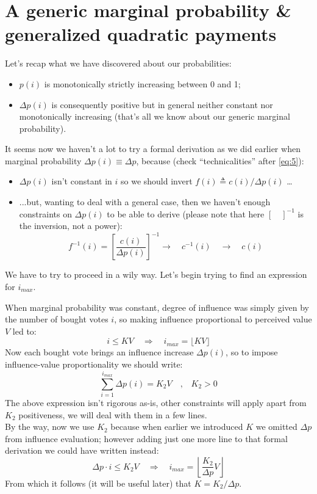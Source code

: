 \documentclass[10pt,a4paper]{article}
\begin{document}
	\section{A generic marginal probability \& generalized quadratic payments}
	Let’s recap what we have discovered about our probabilities:
	\begin{itemize}
		\item $p(i)$ is monotonically strictly increasing between 0 and 1;
		\item $\Delta p(i)$ is consequently positive but in general neither constant nor monotonically increasing (that’s all we know about our generic marginal probability).
	\end{itemize}
	It seems now we haven’t a lot to try a formal derivation as we did earlier when marginal probability $\Delta p(i) \equiv \Delta p$, because (check \enquote{technicalities} after \ref{eq:5}):
	\begin{itemize}
		\item $\Delta p(i)$ isn’t constant in $i$ so we should invert $f(i) \triangleq c(i)/\Delta p(i)$ \dots
		\item ...but, wanting to deal with a general case, then we haven’t enough constraints on $\Delta p(i)$ to be able to derive (please note that here $[\quad]^{-1}$ is the inversion, not a power):
		\begin{equation*}
			f^{-1}(i) = \left[ \frac{c(i)}{\Delta p(i)}\right]^{-1} \longrightarrow \quad c^{-1}(i) \quad \longrightarrow \quad c(i)
		\end{equation*}
	\end{itemize}
	We have to try to proceed in a wily way. Let’s begin trying to find an expression for $i_{max}$.
	
	When marginal probability was constant, degree of influence was simply given by the number of bought votes $i$, so making influence proportional to perceived value $V$ led to:
	\begin{equation*}
		i \leq KV \quad \Longrightarrow \quad i_{max} = \lfloor KV \rfloor
	\end{equation*}
	Now each bought vote brings an influence increase $\Delta p(i)$, so to impose influence-value proportionality we should write:
	\begin{equation}\label{eq:6}
		\sum_{i=1}^{i_{max}} \Delta p(i) = K_{2}V \quad \textrm{,} \quad K_{2}>0
	\end{equation}
	The above expression isn’t rigorous as-is, other constraints will apply apart from $K_{2}$ positiveness, we will deal with them in a few lines.\\
	By the way, now we use $K_{2}$ because when earlier we introduced $K$ we omitted $\Delta p$ from influence evaluation; however adding just one more line to that formal derivation we could have written instead:
	\begin{equation}\label{eq:7}
		\Delta p \cdot i \leq K_{2}V \quad \Longrightarrow \quad i_{max} = \left\lfloor \frac{K_{2}}{\Delta p} V \right\rfloor
	\end{equation}
	From which it follows (it will be useful later) that $K = K_{2} / \Delta p$.
	
\end{document}
